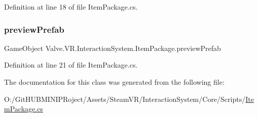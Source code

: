 Definition at line 18 of file Item\+Package.\+cs.

\mbox{\label{class_valve_1_1_v_r_1_1_interaction_system_1_1_item_package_acb818fd48d980318ce81d8116a05b116}} 
\subsubsection{\texorpdfstring{previewPrefab}{previewPrefab}}
{\footnotesize\ttfamily Game\+Object Valve.\+V\+R.\+Interaction\+System.\+Item\+Package.\+preview\+Prefab}



Definition at line 21 of file Item\+Package.\+cs.



The documentation for this class was generated from the following file\+:\begin{DoxyCompactItemize}
\item 
O\+:/\+Git\+H\+U\+B\+M\+I\+N\+I\+P\+Roject/\+Assets/\+Steam\+V\+R/\+Interaction\+System/\+Core/\+Scripts/\mbox{\hyperlink{_item_package_8cs}{Item\+Package.\+cs}}\end{DoxyCompactItemize}
